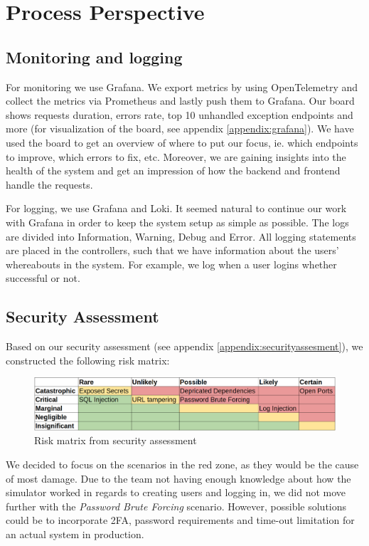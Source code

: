 \section{Process Perspective}



\subsection{Monitoring and logging}
For monitoring we use Grafana. We export metrics by using OpenTelemetry and collect the metrics via Prometheus and lastly push them to Grafana. Our board shows requests duration, errors rate, top 10 unhandled exception endpoints and more (for visualization of the board, see appendix \ref{appendix:grafana}). We have used the board to get an overview of where to put our focus, ie. which endpoints to improve, which errors to fix, etc. Moreover, we are gaining insights into the health of the system and get an impression of how the backend and frontend handle the requests.

For logging, we use Grafana and Loki. It seemed natural to continue our work with Grafana in order to keep the system setup as simple as possible. The logs are divided into Information, Warning, Debug and Error. All logging statements are placed in the controllers, such that we have information about the users' whereabouts in the system. For example, we log when a user logins whether successful or not.

\subsection{Security Assessment}
Based on our security assessment (see appendix \ref{appendix:securityassesment}), we constructed the following risk matrix:
\begin{figure}[H]
    \centering
    \includegraphics[width=1\linewidth]{images/risk-matrix.png}
    \caption{Risk matrix from security assessment}
    \label{fig:enter-label}
\end{figure}
We decided to focus on the scenarios in the red zone, as they would be the cause of most damage. Due to the team not having enough knowledge about how the simulator worked in regards to creating users and logging in, we did not move further with the \textit{Password Brute Forcing} scenario. However, possible solutions could be to incorporate 2FA, password requirements and time-out limitation for an actual system in production.

